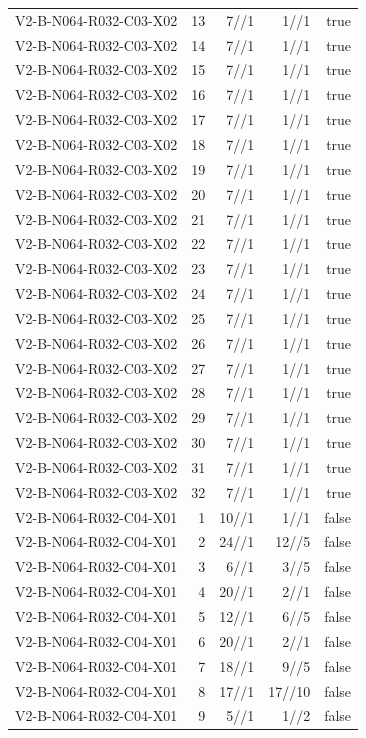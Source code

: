 {\begin{longtable}{lrrrr}
V2-B-N064-R032-C03-X02 & 13 & 7//1 & 1//1 & true \\
V2-B-N064-R032-C03-X02 & 14 & 7//1 & 1//1 & true \\
V2-B-N064-R032-C03-X02 & 15 & 7//1 & 1//1 & true \\
V2-B-N064-R032-C03-X02 & 16 & 7//1 & 1//1 & true \\
V2-B-N064-R032-C03-X02 & 17 & 7//1 & 1//1 & true \\
V2-B-N064-R032-C03-X02 & 18 & 7//1 & 1//1 & true \\
V2-B-N064-R032-C03-X02 & 19 & 7//1 & 1//1 & true \\
V2-B-N064-R032-C03-X02 & 20 & 7//1 & 1//1 & true \\
V2-B-N064-R032-C03-X02 & 21 & 7//1 & 1//1 & true \\
V2-B-N064-R032-C03-X02 & 22 & 7//1 & 1//1 & true \\
V2-B-N064-R032-C03-X02 & 23 & 7//1 & 1//1 & true \\
V2-B-N064-R032-C03-X02 & 24 & 7//1 & 1//1 & true \\
V2-B-N064-R032-C03-X02 & 25 & 7//1 & 1//1 & true \\
V2-B-N064-R032-C03-X02 & 26 & 7//1 & 1//1 & true \\
V2-B-N064-R032-C03-X02 & 27 & 7//1 & 1//1 & true \\
V2-B-N064-R032-C03-X02 & 28 & 7//1 & 1//1 & true \\
V2-B-N064-R032-C03-X02 & 29 & 7//1 & 1//1 & true \\
V2-B-N064-R032-C03-X02 & 30 & 7//1 & 1//1 & true \\
V2-B-N064-R032-C03-X02 & 31 & 7//1 & 1//1 & true \\
V2-B-N064-R032-C03-X02 & 32 & 7//1 & 1//1 & true \\
V2-B-N064-R032-C04-X01 & 1 & 10//1 & 1//1 & false \\
V2-B-N064-R032-C04-X01 & 2 & 24//1 & 12//5 & false \\
V2-B-N064-R032-C04-X01 & 3 & 6//1 & 3//5 & false \\
V2-B-N064-R032-C04-X01 & 4 & 20//1 & 2//1 & false \\
V2-B-N064-R032-C04-X01 & 5 & 12//1 & 6//5 & false \\
V2-B-N064-R032-C04-X01 & 6 & 20//1 & 2//1 & false \\
V2-B-N064-R032-C04-X01 & 7 & 18//1 & 9//5 & false \\
V2-B-N064-R032-C04-X01 & 8 & 17//1 & 17//10 & false \\
V2-B-N064-R032-C04-X01 & 9 & 5//1 & 1//2 & false \\

\end{longtable}}
